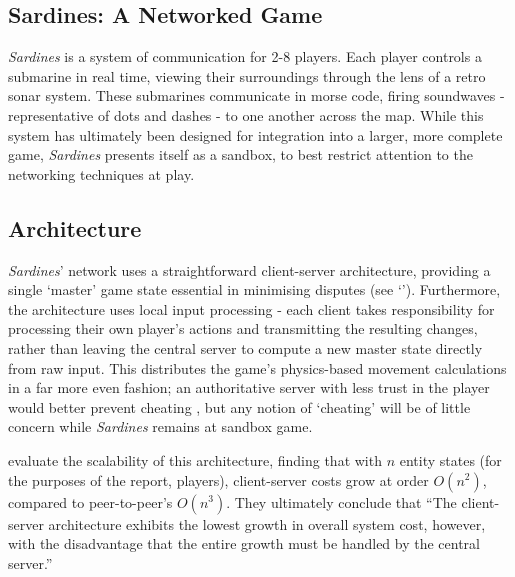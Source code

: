 \documentclass[a4paper, 10pt]{article}
\begin{document}
\graphicspath{{./Images/}}
\begin{flushleft}

\section*{Sardines: A Networked Game}

\textit{Sardines} is a system of communication for 2-8 players. Each player controls a submarine in real time, viewing their surroundings through the lens of a retro sonar system. These submarines communicate in morse code, firing soundwaves - representative of dots and dashes - to one another across the map. While this system has ultimately been designed for integration into a larger, more complete game, \textit{Sardines} presents itself as a sandbox, to best restrict attention to the networking techniques at play.

\subsection*{Architecture}\label{Architecture}

\textit{Sardines}' network uses a straightforward client-server architecture, providing a single `master' game state essential in minimising disputes (see `'). Furthermore, the architecture uses local input processing - each client takes responsibility for processing their own player's actions and transmitting the resulting changes, rather than leaving the central server to compute a new master state directly from raw input. This distributes the game's physics-based movement calculations in a far more even fashion; an authoritative server with less trust in the player would better prevent cheating \citep{gmbta10}, but any notion of `cheating' will be of little concern while \textit{Sardines} remains at sandbox game.

\vspace{5pt}\noindent
\citeauthor{bauer04} \citeyearpar{bauer04} evaluate the scalability of this architecture, finding that with $n$ entity states (for the purposes of the report, players), client-server costs grow at order $O(n^2)$, compared to peer-to-peer's $O(n^3)$. They ultimately conclude that ``The client-server architecture exhibits the lowest growth in overall system cost, however, with the disadvantage that the entire growth must be handled by the central server.''  


\end{flushleft}
\end{document}
